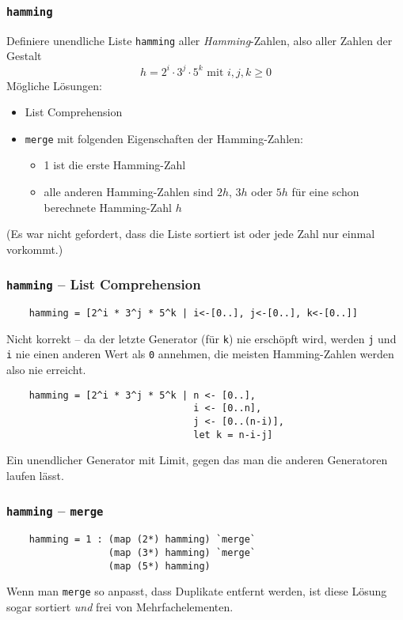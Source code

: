 \documentclass{beamer}
\begin{document}
\begin{frame}
  \frametitle{\lstinline{hamming}}
  Definiere unendliche Liste \lstinline{hamming} aller \emph{Hamming}-Zahlen, also aller Zahlen der Gestalt
  \[h = 2^i \cdot 3^j \cdot 5^k \text{ mit } i,j,k ≥ 0\]
  Mögliche Lösungen:
  \begin{itemize}
  \item List Comprehension
  \item \lstinline{merge} mit folgenden Eigenschaften der Hamming-Zahlen:
    \begin{itemize}
    \item 1 ist die erste Hamming-Zahl
    \item alle anderen Hamming-Zahlen sind $2h$, $3h$ oder $5h$ für eine schon berechnete Hamming-Zahl $h$
    \end{itemize}
  \end{itemize}
  (Es war nicht gefordert, dass die Liste sortiert ist oder jede Zahl nur einmal vorkommt.)
\end{frame}

\begin{frame}[fragile]
  \frametitle{\lstinline{hamming} – List Comprehension}
  \begin{lstlisting}
    hamming = [2^i * 3^j * 5^k | i<-[0..], j<-[0..], k<-[0..]]
  \end{lstlisting}
  Nicht korrekt – da der letzte Generator (für \lstinline{k}) nie erschöpft wird,
  werden \lstinline{j} und \lstinline{i} nie einen anderen Wert als \lstinline{0} annehmen,
  die meisten Hamming-Zahlen werden also nie erreicht.
  \pause
  \begin{lstlisting}
    hamming = [2^i * 3^j * 5^k | n <- [0..],
                                 i <- [0..n],
                                 j <- [0..(n-i)],
                                 let k = n-i-j]
  \end{lstlisting}
  Ein unendlicher Generator mit Limit, gegen das man die anderen Generatoren laufen lässt.
\end{frame}

\begin{frame}[fragile]
  \frametitle{\lstinline{hamming} – \lstinline{merge}}
  \begin{lstlisting}
    hamming = 1 : (map (2*) hamming) `merge`
                  (map (3*) hamming) `merge`
                  (map (5*) hamming)
  \end{lstlisting}
  Wenn man \lstinline{merge} so anpasst, dass Duplikate entfernt werden,
  ist diese Lösung sogar sortiert \emph{und} frei von Mehrfachelementen.
\end{frame}
\end{document}
